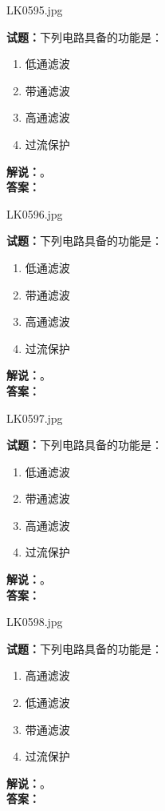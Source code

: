 \documentclass{ctexbook}
\begin{document}
\bigskip

LK0595.jpg

\noindent\textbf{试题：}下列电路具备的功能是：
\begin{enumerate}[leftmargin=3em]
  \item 低通滤波
  \item 带通滤波
  \item 高通滤波
  \item 过流保护
\end{enumerate}
\noindent\textbf{解说：}\textbf{}。\\\noindent\textbf{答案：}

\bigskip

LK0596.jpg

\noindent\textbf{试题：}下列电路具备的功能是：
\begin{enumerate}[leftmargin=3em]
  \item 低通滤波
  \item 带通滤波
  \item 高通滤波
  \item 过流保护
\end{enumerate}
\noindent\textbf{解说：}\textbf{}。\\\noindent\textbf{答案：}

\bigskip

LK0597.jpg

\noindent\textbf{试题：}下列电路具备的功能是：
\begin{enumerate}[leftmargin=3em]
  \item 低通滤波
  \item 带通滤波
  \item 高通滤波
  \item 过流保护
\end{enumerate}
\noindent\textbf{解说：}\textbf{}。\\\noindent\textbf{答案：}

\bigskip

LK0598.jpg

\noindent\textbf{试题：}下列电路具备的功能是：
\begin{enumerate}[leftmargin=3em]
  \item 高通滤波
  \item 低通滤波
  \item 带通滤波
  \item 过流保护
\end{enumerate}
\noindent\textbf{解说：}\textbf{}。\\\noindent\textbf{答案：}
\end{document}
